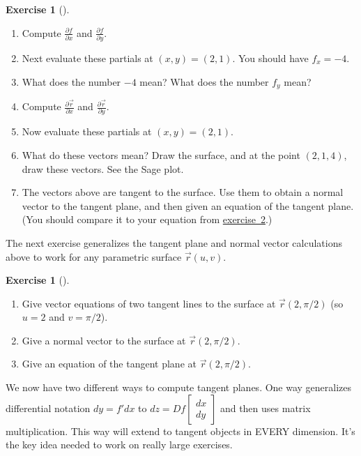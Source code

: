 \documentclass[10pt,]{book}
\theoremstyle{plain}
\theoremstyle{definition}
\theoremstyle{definition}
\theoremstyle{definition}
\theoremstyle{definition}
\newtheorem{exploration}[project]{Exercise}
\theoremstyle{definition}
\numberwithin{equation}{section}
\newcommand{\ds}{\displaystyle}
\begin{document}
\begin{exploration}[]\label{exploration-146}
\leavevmode%
\begin{enumerate}[font=\bfseries,label=(\alph*),ref=\alph*]
\item\label{task-323} Compute \(\ds \frac{\partial f}{\partial x}\) and \(\ds \frac{\partial f}{\partial y}\).%
\item\label{task-324} Next evaluate these partials at \((x,y)=(2,1)\). You should have \(f_x=-4\).%
\item\label{task-325} What does the number \(-4\) mean? What does the number \(f_y\) mean?%
\item\label{task-326} Compute \(\ds \frac{\partial \vec r}{\partial x}\) and \(\ds \frac{\partial \vec r}{\partial y}\).%
\item\label{task-327} Now evaluate these partials at \((x,y)=(2,1)\).%
\item\label{task-328} What do these vectors mean? Draw the surface, and at the point \((2,1,4)\), draw these vectors. See the Sage plot.%
%
\item\label{task-329} The vectors above are tangent to the surface. Use them to obtain a normal vector to the tangent plane, and then given an equation of the tangent plane. (You should compare it to your equation from \hyperref[prob_tangent_plane_downbowl]{exercise~2}.)%
\end{enumerate}
\end{exploration}
The next exercise generalizes the tangent plane and normal vector calculations above to work for any parametric surface \(\vec r(u,v)\).%
\begin{exploration}[]\label{exploration-147}
\leavevmode%
\begin{enumerate}[font=\bfseries,label=(\alph*),ref=\alph*]
\item\label{task-330} Give vector equations of two tangent lines to the surface at \(\vec r(2,\pi/2)\) (so \(u=2\) and \(v=\pi/2\)).%
\item\label{task-331} Give a normal vector to the surface at \(\vec r(2,\pi/2)\).%
\item\label{task-332} Give an equation of the tangent plane at \(\vec r(2,\pi/2)\).%
\end{enumerate}
\end{exploration}
We now have two different ways to compute tangent planes. One way generalizes differential notation \(dy=f'dx\) to \(dz = Df \begin{bmatrix}dx\\dy
\end{bmatrix}\) and then uses matrix multiplication. This way will extend to tangent objects in EVERY dimension. It's the key idea needed to work on really large exercises.%
\end{document}
